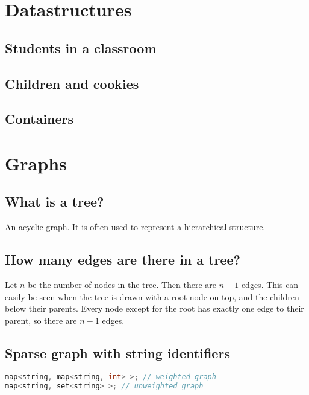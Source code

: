 \section{Datastructures}
\subsection{Students in a classroom}


\subsection{Children and cookies}


\subsection{Containers}




\section{Graphs}
\subsection{What is a tree?}

An acyclic graph. It is often used to represent a hierarchical structure.
\subsection{How many edges are there in a tree?}
Let $n$ be the number of nodes in the tree. Then there are $n-1$ edges. This can easily be seen when the tree is drawn with a root node on top, and the children below their parents. Every node except for the root has exactly one edge to their parent, so there are $n-1$ edges.

\subsection{Sparse graph with string identifiers}
\begin{lstlisting}[language=C++]
map<string, map<string, int> >; // weighted graph
map<string, set<string> >; // unweighted graph
\end{lstlisting}


